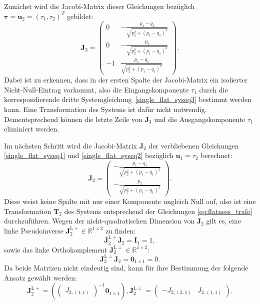 Zunächst wird die Jacobi-Matrix dieser Gleichungen bezüglich $\boldsymbol{\tau} = \mathbf{u}_2 = (\tau_1, \tau_2)^T$ gebildet:
\begin{equation}
	\mathbf{J}_3 =
	\left(\begin{matrix}
		0 & - \frac{p_{1} - q_{1}}{\sqrt{p_{2}^{2} + \left(p_{1} - q_{1}\right)^{2}}}\\
		0 & - \frac{p_{2}}{\sqrt{p_{2}^{2} + \left(p_{1} - q_{1}\right)^{2}}}\\
		-1 & \frac{p_{1} - q_{1}}{\sqrt{p_{2}^{2} + \left(p_{1} - q_{1}\right)^{2}}}
	\end{matrix}\right).
\end{equation}
Dabei ist zu erkennen, dass in der ersten Spalte der Jacobi-Matrix ein isolierter Nicht-Null-Eintrag vorkommt, also die Eingangskomponente $\tau_{1}$ durch die korrespondierende dritte Systemgleichung~\eqref{single_flat_syseq3} bestimmt werden kann. Eine Transformation des Systems ist dafür nicht notwendig. Dementsprechend können die letzte Zeile von $\mathbf{J}_3$ und die Ausgangskomponente $\tau_1$ eliminiert werden.

Im nächsten Schritt wird die Jacobi-Matrix $\mathbf{J}_2$ der verbliebenen Gleichungen \eqref{single_flat_syseq1} und \eqref{single_flat_syseq2} bezüglich $\mathbf{u}_1 = \tau_2$ berechnet: 
\begin{equation}
\mathbf{J}_2 =
\left(\begin{matrix}
- \frac{p_{1} - q_{1}}{\sqrt{p_{2}^{2} + \left(p_{1} - q_{1}\right)^{2}}}\\
- \frac{p_{2}}{\sqrt{p_{2}^{2} + \left(p_{1} - q_{1}\right)^{2}}}
\end{matrix}\right).
\end{equation}
Diese weist keine Spalte mit nur einer Komponente ungleich Null auf, also ist eine Transformation $\mathbf{T}_2$ des Systems entsprechend der Gleichungen \eqref{eq:flatness_trafo} durchzuführen. Wegen der nicht-quadratischen Dimension von $\mathbf{J}_2$ gilt es, eine linke Pseudoinverse $\mathbf{J}_2^{\mathrm{L}+} \in \mathbb{R}^{1 \times 2}$ zu finden:
\begin{equation}
\mathbf{J}_2^{\mathrm{L}+} \mathbf{J}_2 = \mathbf{I}_{1} = 1,
\end{equation}
sowie das linke Orthokomplement $\mathbf{J}_2^{\mathrm{L}\perp} \in \mathbb{R}^{1 \times 2}$:
\begin{equation}
\mathbf{J}_2^{\mathrm{L}\perp} \mathbf{J}_2 = \mathbf{0}_{1 \times 1} = 0.
\end{equation}
Da beide Matrizen nicht eindeutig sind, kann für ihre Bestimmung der folgende Ansatz gewählt werden: 
\begin{equation}
\mathbf{J}_2^{\mathrm{L}+} =
\left(
\left(\begin{matrix}
J_{2, (1,1)}
\end{matrix}\right)^{-1}	
\mathbf{0}_{1 \times 1}
\right), 		
\mathbf{J}_2^{\mathrm{L}\perp} =
\left(\begin{matrix}
-J_{2, (2,1)} & J_{2, (1,1)}
\end{matrix}\right).
\end{equation}

